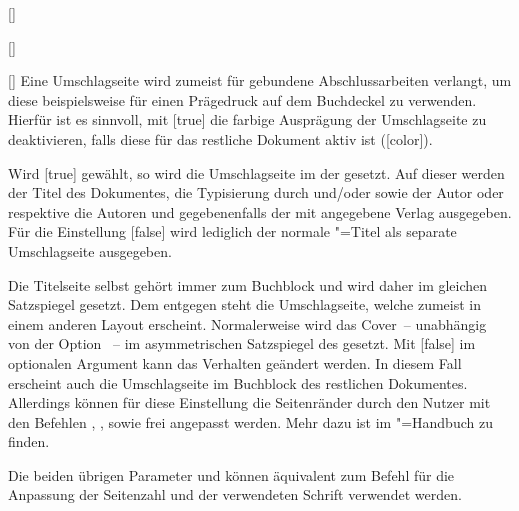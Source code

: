 \begin{Declaration}{}
\begin{Declaration}{[\PBoolean]}
\begin{Declaration}[v2.02]{%
  []%
}
\begin{Declaration}{[\PSet]}
\printdeclarationlist%
%
Eine Umschlagseite wird zumeist für gebundene Abschlussarbeiten verlangt, um 
diese beispielsweise für einen Prägedruck auf dem Buchdeckel zu verwenden. 
Hierfür ist es sinnvoll, mit [true] die farbige Ausprägung der 
Umschlagseite zu deaktivieren, falls diese für das restliche Dokument aktiv ist 
([color]).

Wird [true] gewählt, so wird die Umschlagseite im \CD der 
\TnUD gesetzt. Auf dieser werden der Titel des Dokumentes, die Typisierung 
durch  und/oder  sowie der Autor oder respektive 
die Autoren und gegebenenfalls der mit  angegebene Verlag 
ausgegeben.
Für die Einstellung [false] wird lediglich der normale 
\KOMAScript"=Titel als separate Umschlagseite ausgegeben. 

Die Titelseite selbst gehört immer zum Buchblock und wird daher im gleichen 
Satzspiegel gesetzt. Dem entgegen steht die Umschlagseite, welche zumeist in 
einem anderen Layout erscheint. Normalerweise wird das Cover~-- unabhängig von 
der Option ~-- im asymmetrischen Satzspiegel des \CDs gesetzt. 
Mit [false] im optionalen Argument kann das 
Verhalten geändert werden. In diesem Fall erscheint auch die Umschlagseite im 
Buchblock des restlichen Dokumentes. Allerdings können für diese Einstellung 
die Seitenränder durch den Nutzer mit den Befehlen , 
,  sowie 
 frei angepasst werden. Mehr dazu ist im 
\KOMAScript"=Handbuch \scrguide zu finden.

Die beiden übrigen Parameter  und 
 können äquivalent zum Befehl  
für die Anpassung der Seitenzahl und der verwendeten Schrift verwendet werden.
\end{Declaration}
\end{Declaration}
\end{Declaration}
\end{Declaration}

